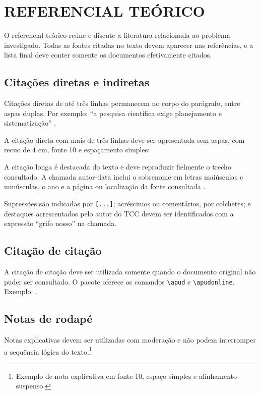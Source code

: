 
\chapter{REFERENCIAL TEÓRICO}

O referencial teórico reúne e discute a literatura relacionada ao problema investigado. Todas as fontes citadas no texto devem aparecer nas referências, e a lista final deve conter somente os documentos efetivamente citados.

\section{Citações diretas e indiretas}

Citações diretas de até três linhas permanecem no corpo do parágrafo, entre aspas duplas. Por exemplo: \enquote{a pesquisa científica exige planejamento e sistematização} \cite[p.~25]{gil2022}.

A citação direta com mais de três linhas deve ser apresentada sem aspas, com recuo de 4 cm, fonte 10 e espaçamento simples:

\begin{citacaodireta}
A citação longa é destacada do texto e deve reproduzir fielmente o trecho consultado. A chamada autor-data inclui o sobrenome em letras maiúsculas e minúsculas, o ano e a página ou localização da fonte consultada \cite[p.~88]{hall2000}.
\end{citacaodireta}

Supressões são indicadas por \texttt{[...]}; acréscimos ou comentários, por colchetes; e destaques acrescentados pelo autor do TCC devem ser identificados com a expressão \enquote{grifo nosso} na chamada.

\section{Citação de citação}

A citação de citação deve ser utilizada somente quando o documento original não puder ser consultado. O pacote oferece os comandos \verb|\apud| e \verb|\apudonline|. Exemplo: .

\section{Notas de rodapé}

Notas explicativas devem ser utilizadas com moderação e não podem interromper a sequência lógica do texto.\footnote{Exemplo de nota explicativa em fonte 10, espaço simples e alinhamento suspenso.}
